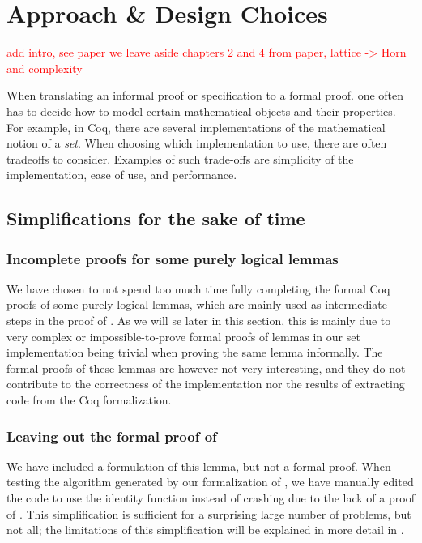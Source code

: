 \chapter{Approach \& Design Choices}
\label{ch:approach_design_choices}

\textcolor{red}{add intro, see paper}
\textcolor{red}{we leave aside chapters 2 and 4 from paper, lattice -> Horn and complexity}

When translating an informal proof or specification to a formal proof.
one often has to decide how to model certain mathematical objects and their properties.
For example, in Coq, there are several implementations of the mathematical notion of a \textit{set}.
When choosing which implementation to use, there are often tradeoffs to consider.
Examples of such trade-offs are simplicity of the implementation, ease of use, and performance.

\section{Simplifications for the sake of time}
\label{sec:simplifications}

\subsection{Incomplete proofs for some purely logical lemmas}
\label{ssec:incomplete_proofs_for_some_purely_logical_lemmas}

We have chosen to not spend too much time fully completing the formal Coq proofs of some purely logical lemmas,
which are mainly used as intermediate steps in the proof of .
As we will se later in this section, this is mainly due to
very complex or impossible-to-prove formal proofs of lemmas in our set implementation
being trivial when proving the same lemma informally.
The formal proofs of these lemmas are however not very interesting,
and they do not contribute to the correctness of the implementation nor
the results of extracting code from the Coq formalization.

\subsection{Leaving out the formal proof of }
\label{ssec:leaving_out_the_formal_proof_of_lem_33}

We have included a formulation of this lemma, but not a formal proof.
When testing the algorithm generated by our formalization of ,
we have manually edited the code to use the identity function instead of crashing due to
the lack of a proof of .
This simplification is sufficient for a surprising large number of problems, but not all;
the limitations of this simplification will be explained in more detail in .


